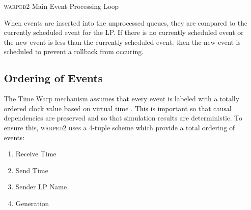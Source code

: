 \documentclass[11pt]{book}
\begin{document}
\begin{algorithm}
\DontPrintSemicolon
{}


\caption{\textsc{warped2} Main Event Processing Loop}\label{warped2_processing}
\end{algorithm}

When events are inserted into the unprocessed queues, they are compared to the currently scheduled
event for the LP.  If there is no currently scheduled event or the new event is less than the
currently scheduled event, then the new event is scheduled to prevent a rollback from occuring.

\subsection{Ordering of Events}

The Time Warp mechanism assumes that every event is labeled with a totally ordered clock value based
on virtual time \cite{jefferson-85}.  This is important so that causal dependencies are preserved
and so that simulation results are deterministic\cite{ronngren-99}.  To ensure this,
\textsc{warped2} uses a 4-tuple scheme which provide a total ordering of events:

\begin{enumerate}
    \item Receive Time
    \item Send Time
    \item Sender LP Name
    \item Generation
\end{enumerate}
\end{document}
